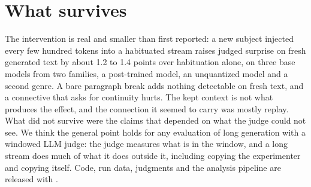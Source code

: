 \documentclass{article}
\begin{document}
\section{What survives}

The intervention is real and smaller than first reported: a new subject
injected every few hundred tokens into a habituated stream raises judged
surprise on fresh generated text by about 1.2 to 1.4 points over habituation
alone, on three base models from two families, a post-trained model, an
unquantized model and a second genre. A bare paragraph break adds nothing
detectable on fresh text, and a connective that asks for continuity hurts.
The kept context is not what produces the effect, and the connection it
seemed to carry was mostly replay. What did not survive were the claims that
depended on what the judge could not see. We think the general point holds
for any evaluation of long generation with a windowed LLM judge: the judge
measures what is in the window, and a long stream does much of what it does
outside it, including copying the experimenter and copying itself. Code, run
data, judgments and the analysis pipeline are released with
\citet{ono2026interrupting}.



\end{document}

